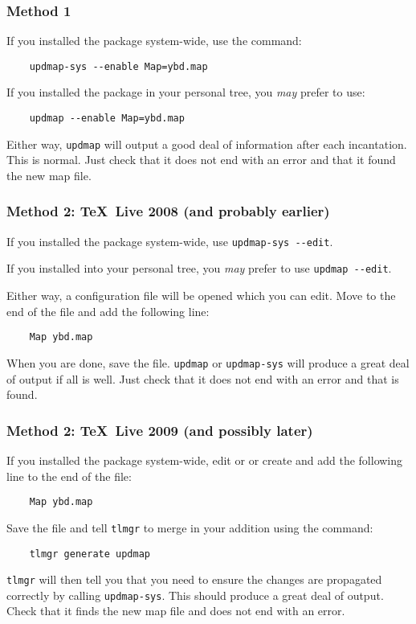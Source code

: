 \documentclass[11pt,british]{article}
\begin{document}
\subsubsection{Method 1}

If you installed the package system-wide, use the command:
\begin{verbatim}
	updmap-sys --enable Map=ybd.map
\end{verbatim}
If you installed the package in your personal tree, you \emph{may} prefer to use:
\begin{verbatim}
	updmap --enable Map=ybd.map
\end{verbatim}

Either way, \verb|updmap| will output a good deal of information after each incantation. This is normal. Just check that it does not end with an error and that it found the new map file.

\subsubsection{Method 2: \TeX~Live 2008 (and probably earlier)}

If you installed the package system-wide, use \verb|updmap-sys --edit|.

If you installed into your personal tree, you \emph{may} prefer to use	\verb|updmap --edit|.

Either way, a configuration file will be opened which you can edit. Move to the end of the file and add the following line:
\begin{verbatim}
	Map ybd.map
\end{verbatim}
When you are done, save the file. \verb|updmap| or \verb|updmap-sys| will produce a great deal of output if all is well. Just check that it does not end with an error and that  is found.

\subsubsection{Method 2: \TeX~Live 2009 (and possibly later)}

If you installed the package system-wide, edit or or create  and add the following line to the end of the file:
\begin{verbatim}
	Map ybd.map
\end{verbatim}
Save the file and tell \verb|tlmgr| to merge in your addition using the command:
\begin{verbatim}
	tlmgr generate updmap
\end{verbatim}
\verb|tlmgr| will then tell you that you need to ensure the changes are propagated correctly by calling \verb|updmap-sys|. This should produce a great deal of output. Check that it finds the new map file and does not end with an error.
\end{document}
